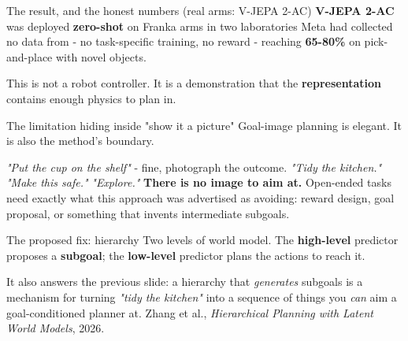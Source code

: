 \documentclass[aspectratio=169]{beamer}
\begin{document}
\begin{frame}{The result, and the honest numbers \small (real arms: V-JEPA 2-AC)}
  \small
  \textbf{V-JEPA 2-AC} was deployed \textbf{zero-shot} on Franka arms in two laboratories
  Meta had collected no data from - no task-specific training, no reward - reaching
  \textbf{65-80\%} on pick-and-place with novel objects.
  \vskip 10pt
  \begin{center}
  \end{center}
  \vskip 8pt
  \footnotesize
  This is not a robot controller. It is a demonstration that the \textbf{representation}
  contains enough physics to plan in.
\end{frame}

\begin{frame}{The limitation hiding inside "show it a picture"}
  \small
  Goal-image planning is elegant. It is also the method's boundary.
  \vskip 8pt
  \begin{center}
  \end{center}
  \vskip 10pt
  \emph{"Put the cup on the shelf"} - fine, photograph the outcome.
  \vskip 6pt
  \emph{"Tidy the kitchen."} \emph{"Make this safe."} \emph{"Explore."} \textbf{There is no
  image to aim at.}
  \vskip 10pt
  Open-ended tasks need exactly what this approach was advertised as avoiding: reward
  design, goal proposal, or something that invents intermediate subgoals.
\end{frame}

\begin{frame}{The proposed fix: hierarchy}
  \small
  Two levels of world model. The \textbf{high-level} predictor proposes a
  \textbf{subgoal}; the \textbf{low-level} predictor plans the actions to reach it.
  \vskip 8pt
  \begin{center}
  \end{center}
  \vskip 10pt
  It also answers the previous slide: a hierarchy that \emph{generates} subgoals is a
  mechanism for turning \emph{"tidy the kitchen"} into a sequence of things you \emph{can}
  aim a goal-conditioned planner at.
  \vskip 8pt
  \footnotesize\color{gray}
  Zhang et al., \emph{Hierarchical Planning with Latent World Models}, 2026.
\end{frame}
\end{document}
